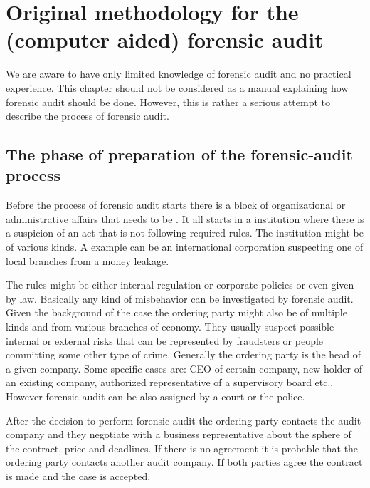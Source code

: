\chapter{Original methodology for the (computer aided) forensic audit}


We are aware to have only limited knowledge of forensic audit and no practical experience. This chapter should not be considered as a manual explaining how forensic audit should be done.  However, this is rather a serious attempt to describe the process of forensic audit.


\section{The phase of preparation of the forensic-audit process}
Before the process of forensic audit starts there is a block of organizational or administrative affairs that needs to be . It all starts in a institution where there is a suspicion of an act that is not following required rules. The institution might be of various kinds. A example can be an international corporation suspecting one of local branches from a money leakage. 

The rules might be either internal regulation or corporate policies or even given by law. Basically any kind of misbehavior can be investigated by forensic audit. Given the background of the case the ordering party might also be of multiple kinds and from various branches of economy. They usually suspect possible internal or external risks that can be represented by fraudsters or people committing some other type of crime.  Generally the ordering party is the head of a given company. Some specific cases are: CEO of certain company, new holder of an existing company, authorized representative of a supervisory board etc.. However forensic audit can be also assigned by a court or the police. 

After the decision to perform forensic audit the ordering party contacts the audit company and they negotiate with a business representative about the sphere of the contract, price and deadlines. If there is no agreement it is probable that the ordering party contacts another audit company. If both parties agree the contract is made and the case is accepted. 

